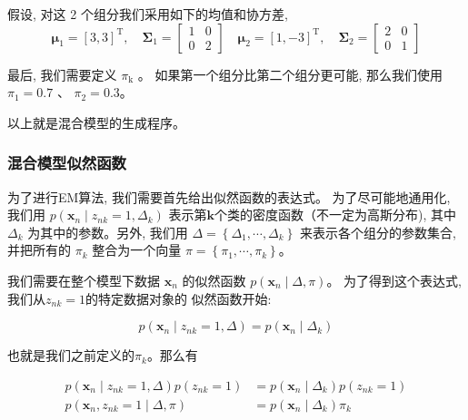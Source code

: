 \documentclass[UTF8]{ctexart}
\numberwithin{equation}{section}
\begin{document}
假设, 对这 2 个组分我们采用如下的均值和协方差,
\begin{equation}
\boldsymbol{\mu}_{1}=[3,3]^{\mathrm{T}}, \quad \boldsymbol{\Sigma}_{1}=\left[\begin{array}{ll}
1 & 0 \\
0 & 2
\end{array}\right] \quad \boldsymbol{\mu}_{2}=[1,-3]^{\mathrm{T}}, \quad \boldsymbol{\Sigma}_{2}=\left[\begin{array}{ll}
2 & 0 \\
0 & 1
\end{array}\right]
\end{equation}

最后, 我们需要定义 $\pi_{\mathrm{k}}$ 。
如果第一个组分比第二个组分更可能, 
那么我们使用 $\pi_{1}=0.7$ 、 $\pi_{2}=0.3$。 

以上就是混合模型的生成程序。

\subsubsection{混合模型似然函数}
为了进行EM算法, 我们需要首先给出似然函数的表达式。
为了尽可能地通用化, 我们用
$p\left(\boldsymbol{x}_{n} \mid z_{n k}=1, \Delta_{k}\right)$ 
表示第$\boldsymbol{k}$个类的密度函数（不一定为高斯分布), 
其中 $\Delta_{k}$ 为其中的参数。另外, 我们用 
$\Delta=\left\{\Delta_{1}, \cdots, \Delta_{k}\right\}$ 
来表示各个组分的参数集合, 并把所有的 $\pi_{k}$ 整合为一个向量 
$\pi=\left\{\pi_{1}, \cdots, \pi_{k}\right\}$。

我们需要在整个模型下数据 $\boldsymbol{x}_{n}$ 的似然函数
$p\left(\boldsymbol{x}_{n} \mid \Delta, \pi\right)$。
为了得到这个表达式, 我们从$z_{n k}=1$的特定数据对象的
似然函数开始:

\begin{equation}
p\left(\boldsymbol{x}_{n} \mid z_{n k}=1, \Delta\right)=p\left(\boldsymbol{x}_{n} \mid \Delta_{k}\right) 
\end{equation}

也就是我们之前定义的$\pi_{k}$。那么有

$$
\begin{aligned}
p\left(\boldsymbol{x}_{n} \mid z_{n k}=1, \Delta\right) p\left(z_{n k}=1\right)&=p\left(\boldsymbol{x}_{n} \mid \Delta_{k}\right) p\left(z_{n k}=1\right) \\
p\left(\boldsymbol{x}_{n}, z_{n k}=1 \mid \Delta, \pi\right)&=p\left(\boldsymbol{x}_{n} \mid \Delta_{k}\right) \pi_{k}
\end{aligned}
$$
\end{document}
